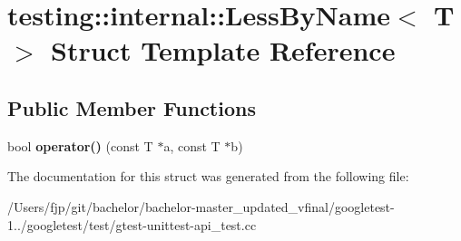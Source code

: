 \hypertarget{structtesting_1_1internal_1_1_less_by_name}{}\section{testing\+:\+:internal\+:\+:Less\+By\+Name$<$ T $>$ Struct Template Reference}
\label{structtesting_1_1internal_1_1_less_by_name}
\subsection*{Public Member Functions}
\begin{DoxyCompactItemize}
\item 
\mbox{\label{structtesting_1_1internal_1_1_less_by_name_a62386ac7750bfc035536be55d90a52eb}} 
bool {\bfseries operator()} (const T $\ast$a, const T $\ast$b)
\end{DoxyCompactItemize}


The documentation for this struct was generated from the following file\+:\begin{DoxyCompactItemize}
\item 
/\+Users/fjp/git/bachelor/bachelor-\/master\+\_\+updated\+\_\+vfinal/googletest-\/1../googletest/test/gtest-\/unittest-\/api\+\_\+test.\+cc\end{DoxyCompactItemize}
